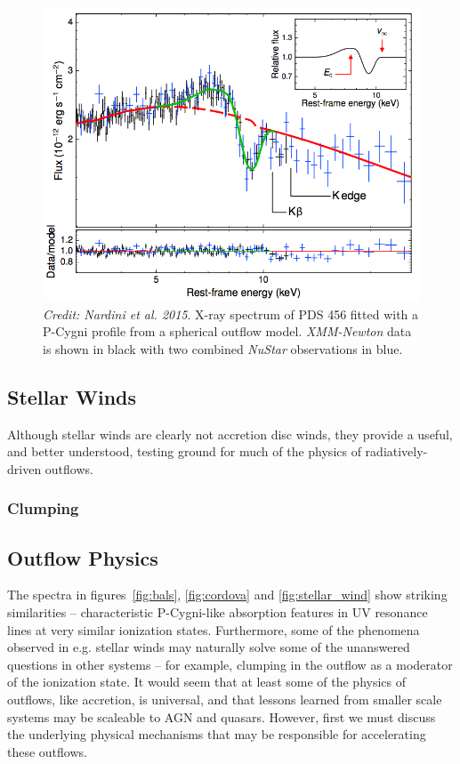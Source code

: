 \begin{figure}
\centering
\includegraphics[width=1.0\textwidth]{figures/02-outflows/nardini_pds456.png}
\caption
{
{\sl Credit: Nardini et al. 2015}. 
X-ray spectrum of PDS 456 fitted with a P-Cygni profile from a 
spherical outflow model. {\sl XMM-Newton} data is shown in black 
with two combined {\sl NuStar} observations in blue.
} 
\label{fig:nardini}
\end{figure}


\subsection{Stellar Winds}

Although stellar winds are clearly not accretion disc winds,
they provide a useful, and better understood, testing ground for much
of the physics of radiatively-driven outflows.

\subsubsection{Clumping}

\subsection{Outflow Physics}

The spectra in figures~\ref{fig:bals}, \ref{fig:cordova}
and \ref{fig:stellar_wind} show striking similarities -- 
characteristic P-Cygni-like absorption features in UV resonance
lines at very similar ionization states. Furthermore, some of the
phenomena observed in e.g. stellar winds may naturally solve some of 
the unanswered questions in other systems -- for example, clumping
in the outflow as a moderator of the ionization state. It would seem
that at least some of the physics of outflows, like accretion,
is universal, and that lessons learned from smaller scale systems may be
scaleable to AGN and quasars. However, first we must discuss the 
underlying physical mechanisms that may be responsible for accelerating
these outflows.


